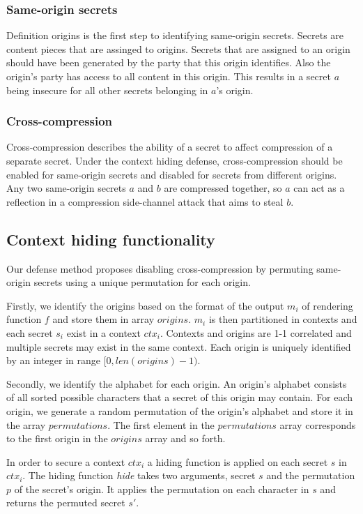 \documentclass[conference, letterpaper, 10pt]{IEEEtran}
\begin{document}
\subsubsection{Same-origin secrets}
Definition origins is the first step to identifying same-origin secrets. Secrets
are content pieces that are assinged to origins. Secrets that are assigned to an
origin should have been generated by the party that this origin identifies.
Also the origin's party has access to all content in this origin. This results
in a secret $a$ being insecure for all other secrets belonging in $a$'s origin.

\subsubsection{Cross-compression}
Cross-compression describes the ability of a secret to affect compression of a
separate secret. Under the context hiding defense, cross-compression should be
enabled for same-origin secrets and disabled for secrets from different origins.
Any two same-origin secrets $a$ and $b$ are compressed together, so $a$ can act
as a reflection in a compression side-channel attack that aims to steal $b$.

\subsection{Context hiding functionality}
Our defense method proposes disabling cross-compression by permuting same-origin
secrets using a unique permutation for each origin.

Firstly, we identify the origins based on the format of the output $m_i$ of
rendering function $f$ and store them in array $origins$. $m_i$ is then
partitioned in contexts and each secret $s_i$ exist in a context $ctx_i$.
Contexts and origins are 1-1 correlated and multiple secrets may exist in the
same context. Each origin is uniquely identified by an integer in range $[0,
len(origins)-1)$.

Secondly, we identify the alphabet for each origin. An origin's alphabet
consists of all sorted possible characters that a secret of this origin may
contain. For each origin, we generate a random permutation of the origin's
alphabet and store it in the array $permutations$. The first element in the
$permutations$ array corresponds to the first origin in the $origins$ array and
so forth.

In order to secure a context $ctx_i$ a hiding function is applied on each secret
$s$ in $ctx_i$. The hiding function \textit{hide} takes two arguments, secret $s$ and the
permutation $p$ of the secret's origin. It applies the permutation on each
character in $s$ and returns the permuted secret $s'$.
\end{document}
